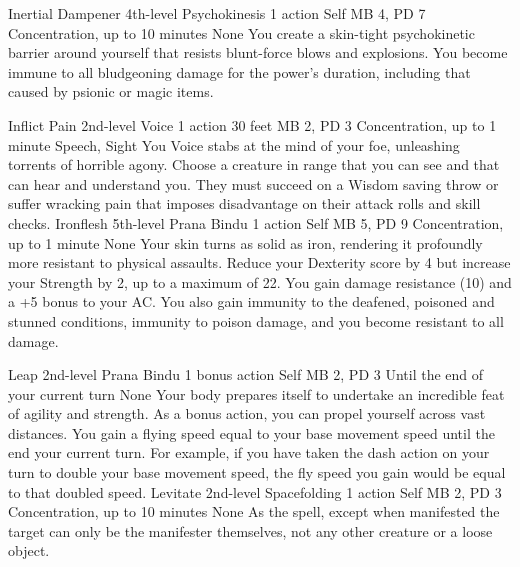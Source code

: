 \DndPowerHeader%
    {Inertial Dampener\label{pwr:inertial_dampener}}
    {4th-level Psychokinesis}
    {1 action}
    {Self}
    {MB 4, PD 7}
    {Concentration, up to 10 minutes}
    {None}
You create a skin-tight psychokinetic barrier
around yourself that resists blunt-force blows and explosions.
You become immune to all bludgeoning damage for the power's duration,
including that caused by psionic or magic items.

\DndPowerHeader%
    {Inflict Pain\label{pwr:inflict_pain}}
    {2nd-level Voice}
    {1 action}
    {30 feet}
    {MB 2, PD 3}
    {Concentration, up to 1 minute}
    {Speech, Sight}
You Voice stabs at the mind of your foe,
unleashing torrents of horrible agony. Choose a creature in
range that you can see and that can hear and understand you.
They must succeed on a Wisdom saving
throw or suffer wracking pain that imposes disadvantage on
their attack rolls and skill checks.
\DndPowerHeader%
    {Ironflesh\label{pwr:ironflesh}}
    {5th-level Prana Bindu}
    {1 action}
    {Self}
    {MB 5, PD 9}
    {Concentration, up to 1 minute}
    {None}
Your skin turns as solid as iron, rendering it profoundly
more resistant to physical assaults.
Reduce your Dexterity score by 4 but increase your Strength by 2,
up to a maximum of 22.
You gain damage resistance (10) and a +5 bonus to your AC.
You also gain immunity to the deafened, poisoned and stunned conditions,
immunity to poison damage,
and you become resistant to all damage.

\DndPowerHeader%
    {Leap\label{pwr:leap}}
    {2nd-level Prana Bindu}
    {1 bonus action}
    {Self}
    {MB 2, PD 3}
    {Until the end of your current turn}
    {None}
Your body prepares itself to undertake an
incredible feat of agility and strength. As a bonus action,
you can propel yourself across vast distances. You gain a
flying speed equal to your base movement speed until the end
your current turn. For example, if you have taken the dash
action on your turn to double your base movement speed, the
fly speed you gain would be equal to that doubled speed.
\DndPowerHeader%
    {Levitate\label{pwr:levitate}}
    {2nd-level Spacefolding}
    {1 action}
    {Self}
    {MB 2, PD 3}
    {Concentration, up to 10 minutes}
    {None}
As the  spell, except when
manifested the target can only be the manifester themselves,
not any other creature or a loose object.

